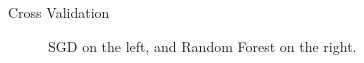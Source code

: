 \documentclass{beamer}
\begin{document}
\begin{frame}{Cross Validation}


\begin{figure}[H]
\centering
\begin{minipage}[b]{0.47\textwidth}
\end{minipage}
\hfill
\begin{minipage}[b]{0.47\textwidth}
\end{minipage}
\caption{SGD on the left, and Random Forest on the right.}
\end{figure}
\end{frame}
\end{document}
